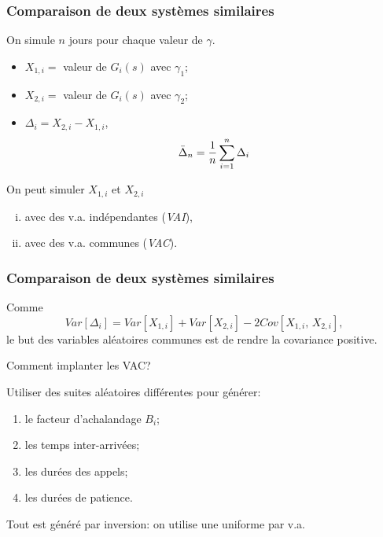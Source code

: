 \documentclass[t,usepdftitle=false]{beamer}
\begin{document}
\begin{frame}
	\frametitle{Comparaison de deux systèmes similaires}
	
	On simule $n$ jours pour chaque valeur de $\gamma$.
	\begin{itemize}
		\item
		${X_{1,i}}=$ valeur de $G_i(s)$ avec $\gamma_1$;
		\item
		${X_{2,i}}=$ valeur de $G_i(s)$ avec $\gamma_2$;
		\item
		${\Delta_i} = X_{2,i}-X_{1,i}$,
		\[
		{\bar\Delta_n} = {1\over n} \sum_{i=1}^n \Delta_i
		\]
	\end{itemize}
	
	\mbox{}
	
	On peut simuler $X_{1,i}$ et $X_{2,i}$
	\begin{enumerate}[(i)]
		\item
		avec des v.a.{} indépendantes (\emph{VAI}),
		\item
		avec des v.a.{} communes (\emph{VAC}).
	\end{enumerate}
	
\end{frame}

\begin{frame}
	\frametitle{Comparaison de deux systèmes similaires}
	
	Comme
	\[
	Var[\Delta_i] = Var[X_{1,i}] + Var[X_{2,i}] - 2Cov[X_{1,i},\,X_{2,i}],
	\]
	le but des variables aléatoires communes est de rendre la covariance positive.
	
	\mbox{}
	
	Comment implanter les VAC?
	
	\mbox{}
	
	Utiliser des suites aléatoires différentes pour générer:
	\begin{enumerate}
		\item
		le facteur d'achalandage $B_i$;
		\item
		les temps inter-arrivées;
		\item
		les durées des appels;
		\item
		les durées de patience.
	\end{enumerate}
	Tout est généré par inversion:  on utilise une uniforme par v.a.
	
\end{frame}
\end{document}
